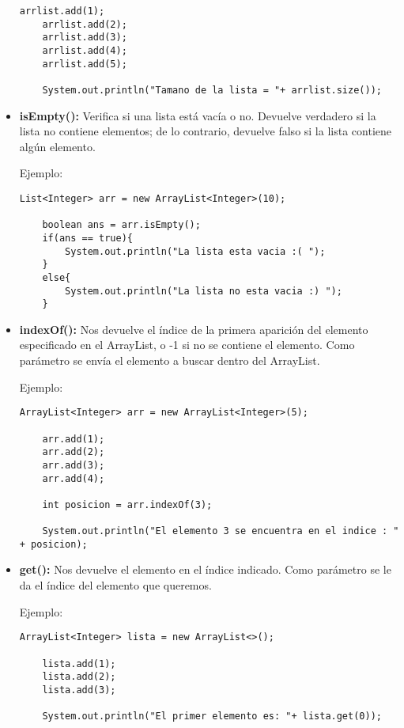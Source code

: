 \documentclass[12pt, letterpaper]{article} %
\begin{document}
\begin{itemize}
\begin{lstlisting}[frame=single]
    arrlist.add(1);
    arrlist.add(2);
    arrlist.add(3);
    arrlist.add(4);
    arrlist.add(5);

    System.out.println("Tamano de la lista = "+ arrlist.size());
    \end{lstlisting}
    
    \item \textbf{isEmpty():} Verifica si una lista está vacía o no. Devuelve verdadero si la lista no contiene elementos; de lo contrario, devuelve falso si la lista contiene algún elemento.
    
    Ejemplo:
    \lstset{language = Java, breaklines=true, basicstyle=\footnotesize}
    \begin{lstlisting}[frame=single]
    List<Integer> arr = new ArrayList<Integer>(10);
    
    boolean ans = arr.isEmpty();
    if(ans == true){
        System.out.println("La lista esta vacia :( ");
    }
    else{
    	System.out.println("La lista no esta vacia :) ");
    }
    \end{lstlisting}

    \item \textbf{indexOf():} Nos devuelve el índice de la primera aparición del elemento especificado en el ArrayList, o -1 si no se contiene el elemento. Como parámetro se envía el elemento a buscar dentro del ArrayList.
    
    Ejemplo:
    \lstset{language = Java, breaklines=true, basicstyle=\footnotesize}
    \begin{lstlisting}[frame=single]
    ArrayList<Integer> arr = new ArrayList<Integer>(5);

    arr.add(1);
    arr.add(2);
    arr.add(3);
    arr.add(4);

    int posicion = arr.indexOf(3);

    System.out.println("El elemento 3 se encuentra en el indice : " + posicion);
    \end{lstlisting}

    \item \textbf{get():} Nos devuelve el elemento en el índice indicado. Como parámetro se le da el índice del elemento que queremos.
    
    Ejemplo:
    \lstset{language = Java, breaklines=true, basicstyle=\footnotesize}
    \begin{lstlisting}[frame=single]
    ArrayList<Integer> lista = new ArrayList<>();

    lista.add(1);
    lista.add(2);
    lista.add(3);

    System.out.println("El primer elemento es: "+ lista.get(0));
    \end{lstlisting}
\end{itemize}
\end{document}
